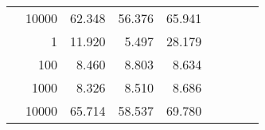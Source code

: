 \begin{table}
\begin{tabular}{rrrrrrrrr}
	            
					 &  
					 
					\multirow{ 1 }{*}{ 10000 } &
					
						
							    
							    
	                           62.348 & 56.376 & 65.941  \\
	                
	            
	        
				\noalign{\smallskip}\hline
				\multirow{ 4 }{*}{ 2000000 } &
				
					
					 
					\multirow{ 1 }{*}{ 1 } &
					
						
							    
							    
	                           11.920 & 5.497 & 28.179  \\
	                
	            
					 &  
					 
					\multirow{ 1 }{*}{ 100 } &
					
						
							    
							    
	                           8.460 & 8.803 & 8.634  \\
	                
	            
					 &  
					 
					\multirow{ 1 }{*}{ 1000 } &
					
						
							    
							    
	                           8.326 & 8.510 & 8.686  \\
	                
	            
					 &  
					 
					\multirow{ 1 }{*}{ 10000 } &
					
						
							    
							    
	                           65.714 & 58.537 & 69.780  \\
	                
	            
	        

\hline

\end{tabular}
\end{table}
\clearpage


	    

